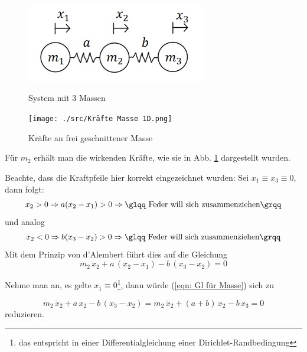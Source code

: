 \documentclass[a4paper,12pt]{report}
\newcommand{\zitat}[1]{\glqq #1\grqq}
\newcommand{\1}{\mathds{1}}
\theoremstyle{plain} %
\theoremstyle{definition} %
\theoremstyle{remark}
\begin{document}
            \begin{figure}[h!t]
                  \centering
                  \begin{minipage}[ht]{0.49\linewidth}
                        \centering
                        \includegraphics[width=0.7\textwidth, keepaspectratio]{./3 Massen System.png}
                        \caption{System mit 3 Massen}
                        \label{fig: 3 Massen System}
                  \end{minipage}
                  \hfill
                  \begin{minipage}[ht]{0.49\linewidth}
                        \centering
                        \texttt{[image: ./src/Kräfte Masse 1D.png]}
                        \caption{Kräfte an frei geschnittener Masse}
                        \label{fig: Kräfte Masse 1D}
                  \end{minipage}
            \end{figure}

            Für $m_2$ erhält man die wirkenden Kräfte, wie sie in Abb. \ref{fig: Kräfte Masse 1D} dargestellt wurden.

            Beachte, dass die Kraftpfeile hier korrekt eingezeichnet wurden:
            Sei $x_1 \equiv x_3 \equiv 0$, dann folgt:
            $$x_2 > 0 \Rightarrow a(x_2-x_1) > 0 \Rightarrow \text{\zitat{Feder will sich zusammenziehen}}$$
            und analog
            $$x_2 < 0 \Rightarrow b(x_3-x_2) > 0 \Rightarrow \text{\zitat{Feder will sich zusammenziehen}}$$
            Mit dem Prinzip von d'Alembert führt dies auf die Gleichung
            \begin{equation}
                  \label{eqn: Gl für Masse}
                  m_2\,\ddot x_2 + a\,(x_2-x_1) - b\,(x_3-x_2) = 0
            \end{equation}

            Nehme man an,  es gelte $x_1 \equiv 0$\footnote{das entspricht in einer Differentialgleichung einer Dirichlet-Randbedingung}, dann würde (\ref{eqn: Gl für Masse}) sich zu

            \begin{equation}
                  \label{eqn: Gl für Masse mit Rand links}
                  m_2\,\ddot x_2 + a\,x_2 - b\,(x_3-x_2) = m_2\,\ddot x_2 + (a+b)\,x_2 -b\,x_3 = 0
            \end{equation}
            reduzieren.
\end{document}
